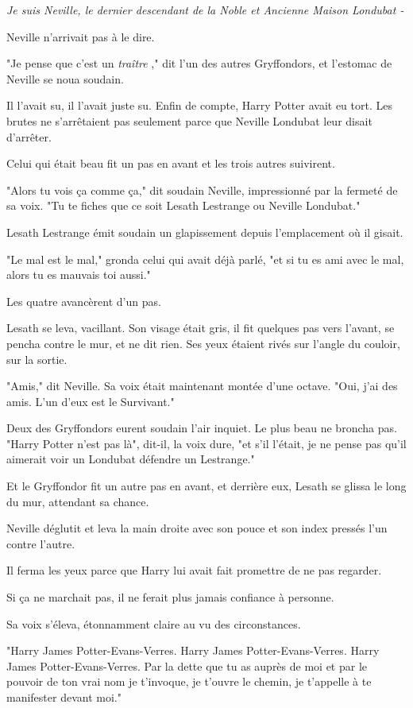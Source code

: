 \emph{Je suis Neville, le dernier descendant de la Noble et Ancienne Maison Londubat -} 

Neville n'arrivait pas à le dire.

"Je pense que c'est un \emph{traître} ," dit l'un des autres Gryffondors, et l'estomac de Neville se noua soudain.

Il l'avait su, il l'avait juste su. Enfin de compte, Harry Potter avait eu tort. Les brutes ne s'arrêtaient pas seulement parce que Neville Londubat leur disait d'arrêter.

Celui qui était beau fit un pas en avant et les trois autres suivirent.

"Alors tu vois ça comme ça," dit soudain Neville, impressionné par la fermeté de sa voix. "Tu te fiches que ce soit Lesath Lestrange ou Neville Londubat."

Lesath Lestrange émit soudain un glapissement depuis l'emplacement où il gisait.

"Le mal est le mal," gronda celui qui avait déjà parlé, "et si tu es ami avec le mal, alors tu es mauvais toi aussi."

Les quatre avancèrent d'un pas.

Lesath se leva, vacillant. Son visage était gris, il fit quelques pas vers l'avant, se pencha contre le mur, et ne dit rien. Ses yeux étaient rivés sur l'angle du couloir, sur la sortie.

"Amis," dit Neville. Sa voix était maintenant montée d'une octave. "Oui, j'ai des amis. L'un d'eux est le Survivant."

Deux des Gryffondors eurent soudain l'air inquiet. Le plus beau ne broncha pas. "Harry Potter n'est pas là", dit-il, la voix dure, "et s'il l'était, je ne pense pas qu'il aimerait voir un Londubat défendre un Lestrange."

Et le Gryffondor fit un autre pas en avant, et derrière eux, Lesath se glissa le long du mur, attendant sa chance.

Neville déglutit et leva la main droite avec son pouce et son index pressés l'un contre l'autre.

Il ferma les yeux parce que Harry lui avait fait promettre de ne pas regarder.

Si ça ne marchait pas, il ne ferait plus jamais confiance à personne.

Sa voix s'éleva, étonnamment claire au vu des circonstances.

"Harry James Potter-Evans-Verres. Harry James Potter-Evans-Verres. Harry James Potter-Evans-Verres. Par la dette que tu as auprès de moi et par le pouvoir de ton vrai nom je t'invoque, je t'ouvre le chemin, je t'appelle à te manifester devant moi."

